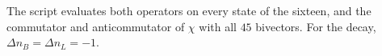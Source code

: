 The script evaluates both operators on every state of the sixteen, and the commutator and anticommutator of $\chi$ with all $45$ bivectors. For the decay, $\Delta n_{B} = \Delta n_{L} = -1$.
